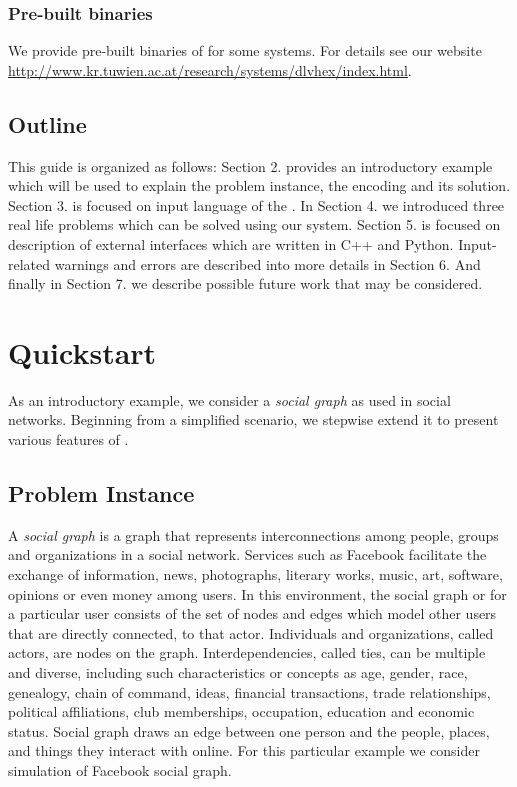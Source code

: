 \documentclass[14pt,a4paper, titlepage]{article}
\begin{document}
\subsubsection{Pre-built binaries}
We provide pre-built binaries of \dlvhex{} for some systems. For details see our website \url{http://www.kr.tuwien.ac.at/research/systems/dlvhex/index.html}. 

\subsection{Outline}
This guide is organized as follows: Section 2. provides an introductory example which will be used to explain the problem instance, the encoding and its solution. Section 3. is focused on input language of the \dlvhex{}. In Section 4. we introduced three real life problems which can be solved using our system. Section 5. is focused on description of external interfaces which are written in C++ and Python. Input-related warnings and errors are described into more details in Section 6. And finally in Section 7. we describe possible future work that may be considered.

\section{Quickstart} %
As an introductory example, we consider a \emph{social graph} as used in social networks. Beginning from a simplified scenario, we stepwise extend it to present various features of \dlvhex{}.

\subsection{Problem Instance}
A \emph{social graph} is a graph that represents interconnections among people, groups 
and organizations in a social network. Services such as Facebook facilitate the exchange 
of information, news, photographs, literary works, music, art, software, opinions or even 
money among users. In this environment, the social graph or for a particular user consists 
of the set of nodes and edges which model other users that are directly connected, to that actor. 
Individuals and organizations, called actors, are nodes on the graph. Interdependencies, 
called ties, can be multiple and diverse, including such characteristics or concepts as age, 
gender, race, genealogy, chain of command, ideas, financial transactions, trade relationships, 
political affiliations, club memberships, occupation, education and economic status. 
Social graph draws an edge between one person and the people, places, and things they interact 
with online. For this particular example we consider simulation of Facebook social graph. 
\end{document}
